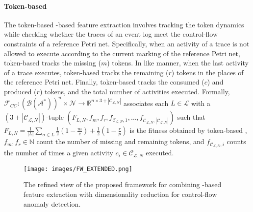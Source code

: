 \paragraph{Token-based } The token-based  -based feature extraction \cite{singh2022lapmsh, debenedictis2023dtadiiot} involves tracking the token dynamics while checking whether the traces of an event log meet the control-flow constraints of a reference Petri net. Specifically, when an activity of a trace is not allowed to execute according to the current marking of the reference Petri net, token-based  tracks the missing ($m$) tokens. In like manner, when the last activity of a trace executes, token-based  tracks the remaining ($r$) tokens in the places of the reference Petri net. Finally, token-based  tracks the consumed ($c$) and produced ($r$) tokens, and the total number of activities executed. Formally, $\mathcal{F}_{CC}:(\mathcal{B}(\mathcal{A}^*))^n\times\mathcal{N}\rightarrow \mathbb{R}^{n\times 3+|\mathcal{C}_{\mathcal{L},N}|}$ associates each $L\in\mathcal{L}$ with a $(3+|\mathcal{C}_{\mathcal{L},N}|)$-tuple $(F_{L,N}, f_m, f_r, f_{\mathcal{C}_{\mathcal{L},N},1},\dots,f_{\mathcal{C}_{\mathcal{L},N},|\mathcal{C}_{\mathcal{L},N}|})$ such that $F_{L,N}=\frac{1}{|L|}\sum_{\sigma\in L}\frac{1}{2}(1-\frac{m}{c})+\frac{1}{2}(1-\frac{r}{p})$ is the fitness obtained by token-based  \cite{aalst2022pmhandbook}, $f_m, f_r\in\mathbb{N}$ count the number of missing and remaining tokens, and $f_{\mathcal{C}_{\mathcal{L},N},i}$ counts the number of times a given activity $c_i\in\mathcal{C}_{\mathcal{L},N}$ executed.

\begin{figure*}[t]
\centering
\texttt{[image: images/FW\_EXTENDED.png]}
\caption{The refined view of the proposed framework for combining -based feature extraction with dimensionality reduction for control-flow anomaly detection.}
\label{FW}
\end{figure*}
